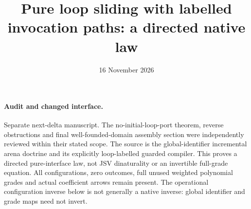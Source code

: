 \documentclass[11pt]{article}
\title{Pure loop sliding with labelled invocation paths: a directed native law}
\date{16 November 2026}
\begin{document}
\maketitle
\paragraph{Audit and changed interface.} Separate next-delta manuscript. The no-initial-loop-port theorem, reverse obstructions and final well-founded-domain assembly section were independently reviewed within their stated scope. The source is the global-identifier incremental arena doctrine and its explicitly loop-labelled guarded compiler. This proves a directed pure-interface law, not JSV dinaturality or an invertible full-grade equation. All configurations, zero outcomes, full unused weighted polynomial grades and actual coefficient arrows remain present. The operational configuration inverse below is not generally a native inverse: global identifier and grade maps need not invert.
\end{document}
